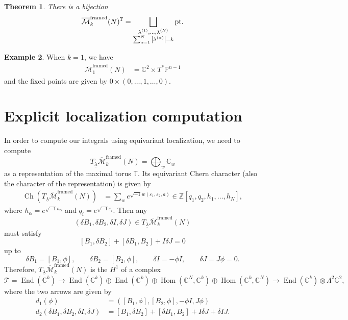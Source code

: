 \documentclass[leqno, openany]{memoir}
\newtheorem{thm}{Theorem}[section]
\theoremstyle{definition}
\newtheorem{exm}[thm]{Example}
\theoremstyle{remark}
\theoremstyle{plain}
\theoremstyle{definition}
\theoremstyle{remark}
\newcommand{\C}{\mathbb{C}}
\newcommand{\Z}{\mathbb{Z}}
\renewcommand{\P}{\mathbb{P}}
\newcommand{\ep}{\varepsilon}
\newcommand{\mc}[1]{\mathcal{#1}}
\newcommand{\T}{\mathbb{T}}
\newcommand{\mr}[1]{\mathrm{#1}}
\newcommand{\on}[1]{\operatorname{#1}}
\newcommand{\ol}[1]{\overline{#1}}
\newcommand{\ul}[1]{\underline{#1}}
\DeclareMathOperator{\Hom}{Hom}
\DeclareMathOperator{\End}{End}
\begin{document}
\begin{thm}
    There is a bijection 
    \[ \ol{\mc{M}}_k^{\mr{framed}}(N)^{\T} = \bigsqcup_{\substack{\lambda^{(1)}, \ldots, \lambda^{(N)} \\ \sum_{\alpha=1}^N \abs{\lambda^{(\alpha)}} = k}} \mr{pt}. \]
\end{thm}

\begin{exm}
    When $k=1$, we have
    \begin{align*}
        \ol{\mc{M}}_1^{\mr{framed}}(N) &= \C^2 \times T^* \P^{n-1}
    \end{align*}
    and the fixed points are given by $\qty{0} \times (0,\ldots,1,\ldots,0)$.
\end{exm}

\section{Explicit localization computation}%
\label{sec:Explicit localization computation}

In order to compute our integrals using equivariant localization, we need to compute
\[ T_{\ul{\lambda}} \ol{\mc{M}}_k^{\mr{framed}}(N) = \bigoplus_w \C_w \]
as a representation of the maximal torus $\T$. Its equivariant Chern character (also the character of the representation) is given by
\begin{align*}
    \on{Ch}(T_{\ul{\lambda}} \ol{\mc{M}}_k^{\mr{framed}}(N)) &= \sum_w e^{\sqrt{-1} w(\ep_1, \ep_2, a)} \in \Z[q_1, q_2, h_1, \ldots, h_N], 
\end{align*}
where $h_{\alpha} = e^{\sqrt{-1} a_{\alpha}}$ and $q_i = e^{\sqrt{-1} \ep_i}$. Then any
\[ (\delta B_1, \delta B_2, \delta I, \delta J) \in T_{\ul{\lambda}} \ol{\mc{M}}_k^{\mr{framed}}(N) \]
must satisfy
\[ [B_1, \delta B_2] + [\delta B_1, B_2] + I \delta J = 0 \]
up to
\[ \delta B_1 = [B_1, \phi], \qquad \delta B_2 = [B_2, \phi], \qquad \delta I = - \phi I, \qquad \delta J = J \phi = 0. \]
Therefore, $T_{\ul{\lambda}} \ol{\mc{M}}_k^{\mr{framed}}(N)$ is the $H^1$ of a complex
\[ \mc{T} = \End(\C^k) \to \End(\C^k) \oplus \End(\C^k) \oplus \Hom(\C^N, \C^k) \oplus \Hom(\C^k, \C^N) \to \End(\C^k) \otimes \Lambda^2 \C^2, \]
where the two arrows are given by
\begin{align*}
    d_1(\phi) &= ([B_1, \phi], [B_2, \phi], -\phi I, J \phi) \\
    d_2(\delta B_1, \delta B_2, \delta I, \delta J) &= [B_1, \delta B_2] + [\delta B_1, B_2] + I \delta J + \delta I J.
\end{align*}
\end{document}
